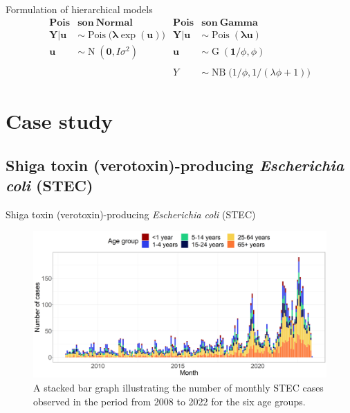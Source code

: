\documentclass[aspectratio=169,handout]{beamer}
\DeclareMathOperator{\G}{G}
\DeclareMathOperator{\N}{N}
\DeclareMathOperator{\NB}{NB}
\DeclareMathOperator{\Pois}{Pois}
\begin{document}
\begin{frame}{Formulation of hierarchical models}
\begin{align*}
  \mathbf{Pois}&\mathbf{son} \ \mathbf{Normal} & \mathbf{Pois}&\mathbf{son} \ \mathbf{Gamma} \\
  \boldsymbol{Y|u} &\sim \Pois \big( \boldsymbol{\lambda} \exp(\boldsymbol{u}) \big) & \boldsymbol{Y|u} &\sim \Pois (\boldsymbol{\lambda u}) \\
  \boldsymbol{u} &\sim \N(\boldsymbol{0},I\sigma^2) & \boldsymbol{u} &\sim \G(\boldsymbol 1/\phi,\phi) \\
  & & & \\
  & & Y&\sim\NB\big(1/\phi,1/(\lambda\phi+1)\big)
\end{align*}
\end{frame}

\hypertarget{case-study}{%
\section{Case study}\label{case-study}}

\hypertarget{shiga-toxin-verotoxin-producing-escherichia-coli-stec}{%
\subsection{\texorpdfstring{Shiga toxin (verotoxin)-producing
\emph{Escherichia coli}
(STEC)}{Shiga toxin (verotoxin)-producing Escherichia coli (STEC)}}\label{shiga-toxin-verotoxin-producing-escherichia-coli-stec}}

\begin{frame}{Shiga toxin (verotoxin)-producing \emph{Escherichia coli}
(STEC)}
\tiny

\begin{figure}[H]
\includegraphics[width=0.75\linewidth]{../../figures/STEC_long_plot} \caption{A stacked bar graph illustrating the number of monthly STEC cases observed in the period from 2008 to 2022 for the six age groups.}\label{fig:STEC}
\end{figure}

\normalsize
\end{frame}
\end{document}
